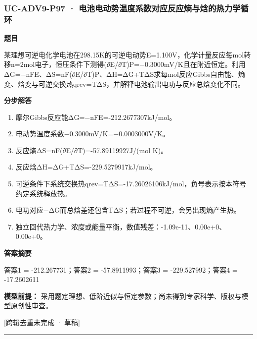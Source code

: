 \documentclass[UTF8,11pt,a4paper]{ctexart}
\begin{document}
\subsubsection*{UC-ADV9-P97 · 电池电动势温度系数对应反应熵与焓的热力学循环}
\noindent\textbf{题目}\par
某理想可逆电化学电池在298.15K的可逆电动势E=1.100V，化学计量反应每mol转移n=2mol电子，恒压条件下测得(∂E/∂T)P=−0.3000mV/K且在附近恒定。利用ΔG=−nFE、ΔS=nF(∂E/∂T)P、ΔH=ΔG+TΔS求每mol反应Gibbs自由能、熵变、焓变与可逆交换热qrev=TΔS，并解释电池输出电功与反应总焓变化不同。\par
\medskip\noindent\textbf{分步解答}
\begin{enumerate}
\item 摩尔Gibbs反应能ΔG=−nFE=-212.2677307kJ/mol。
\item 电动势温度系数−0.3000mV/K=−0.0003000V/K。
\item 反应熵ΔS=nF(∂E/∂T)=-57.89119927J/(mol K)。
\item 反应焓ΔH=ΔG+TΔS=-229.5279917kJ/mol。
\item 可逆条件下系统交换热qrev=TΔS=-17.26026106kJ/mol，负号表示按本符号约定系统释放热。
\item 电功对应−ΔG而总焓差还包含TΔS；若过程不可逆，会另出现熵产生热。
\item 独立回代热力学、浓度或能量平衡，数值残差：-1.09e-11、0.00e+0、0.00e+0。
\end{enumerate}
\noindent\textbf{答案摘要}\par
答案1 = -212.267731；答案2 = -57.8911993；答案3 = -229.527992；答案4 = -17.2602611\par
\noindent\textbf{模型前提：}
采用题定理想、低阶近似与恒定参数；尚未得到专家科学、版权与模型原创性审查。\par
\noindent\textcolor{red!65!black}{[跨辑去重未完成 · 草稿]} \par
\medskip\hrule\medskip
\end{document}
